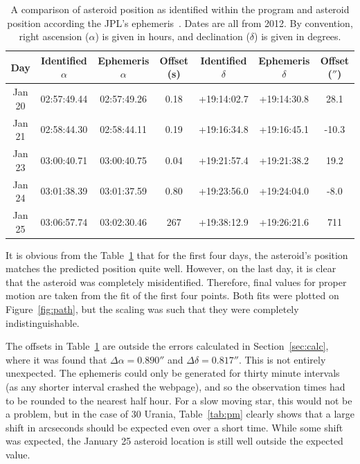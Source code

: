 \documentclass[a4paper,12pt]{article}
\begin{document}
\begin{center}
\begin{table}[!htbp]
  \centering
  \begin{tabular}{c||c||c||c||c||c||c}
  	Day & Identified $\alpha$ & Ephemeris $\alpha$ & Offset (s) & Identified $\delta$ & Ephemeris $\delta$ & Offset ($''$)\\
  	\hline
  	\hline
  	Jan 20 & 02:57:49.44 & 02:57:49.26 & 0.18 & +19:14:02.7 & +19:14:30.8 & 28.1\\
  	\hline
  	Jan 21 & 02:58:44.30 & 02:58:44.11 & 0.19 & +19:16:34.8 & +19:16:45.1 & -10.3\\
  	\hline
  	Jan 23 & 03:00:40.71 & 03:00:40.75 & 0.04 & +19:21:57.4 & +19:21:38.2 & 19.2\\
  	\hline
  	Jan 24 & 03:01:38.39 & 03:01:37.59 & 0.80 & +19:23:56.0 & +19:24:04.0 & -8.0\\
  	\hline
  	Jan 25 & 03:06:57.74 & 03:02:30.46 & 267 & +19:38:12.9 & +19:26:21.6 & 711
   \end{tabular}
    \caption{A comparison of asteroid position as identified within the program and asteroid position according the JPL's ephemeris~\citep{urania}. Dates are all from 2012. By convention, right ascension ($\alpha$) is given in hours, and declination ($\delta$) is given in degrees.}
    \label{tab:position}
\end{table}
\end{center}

It is obvious from the Table~\ref{tab:position} that for the first four days, the asteroid's position matches the predicted position quite well. However, on the last day, it is clear that the asteroid was completely misidentified. Therefore, final values for proper motion are taken from the fit of the first four points. Both fits were plotted on Figure~\ref{fig:path}, but the scaling was such that they were completely indistinguishable.

The offsets in Table~\ref{tab:position} are outside the errors calculated in Section~\ref{sec:calc}, where it was found that $\Delta\alpha = 0.890''$ and $\Delta\delta = 0.817''$. This is not entirely unexpected. The ephemeris could only be generated for thirty minute intervals (as any shorter interval crashed the webpage), and so the observation times had to be rounded to the nearest half hour. For a slow moving star, this would not be a problem, but in the case of 30 Urania, Table~\ref{tab:pm} clearly shows that a large shift in arcseconds should be expected even over a short time. While some shift was expected, the January 25 asteroid location is still well outside the expected value.
\end{document}
